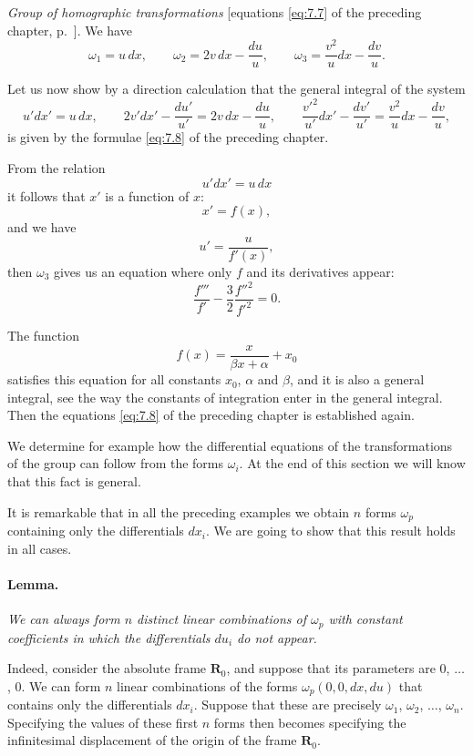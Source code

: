 \documentclass[leqno,11pt]{book}
\numberwithin{equation}{chapter}
\theoremstyle{shape1}
\theoremstyle{shapesmall}
\newcommand{\somespace}{\vspace{9pt}}
\begin{document}
{\somespace

\emph{Group of homographic transformations} [equations \eqref{eq:7.7} of the preceding chapter, p.~\pageref{eq:7.7}]. We have
\begin{equation}
  \label{eq:8.9}
  \omega_{1}=u\,dx,\qquad\omega_{2}=2v\,dx-\frac{du}{u},\qquad\omega_{3}=\frac{v^{2}}{u}dx-\frac{dv}{u}.
\end{equation}

Let us now show by a direction calculation that the general integral of the system
\[
u'dx'=u\,dx,\qquad 2v'dx'-\frac{du'}{u'}=2v\,dx-\frac{du}{u},\qquad\frac{v'^{2}}{u'}dx'-\frac{dv'}{u'}=\frac{v^{2}}{u}dx-\frac{dv}{u},
\]
is given by the formulae \eqref{eq:7.8} of the preceding chapter.

From the relation
\[
u'dx'=u\,dx
\]
it follows that $x'$ is a function of $x$:
\[
x'=f(x),
\]
and we have
\[
u'=\frac{u}{f'(x)},
\]
then $\omega_{3}$ gives us an equation where only $f$ and its derivatives appear:
\begin{equation}
  \label{eq:8.10}
  \frac{f'''}{f'}-\frac{3}{2}\frac{f''^{2}}{f'^{2}}=0.
\end{equation}

The function
\[
f(x)=\frac{x}{\beta x+\alpha}+x_{0}
\]
satisfies this equation for all constants $x_{0}$, $\alpha$ and $\beta$, and it is also a general integral, see the way the constants of integration enter in the general integral. Then the equations \eqref{eq:7.8} of the preceding chapter is established again.

We determine for example how the differential equations of the transformations of the group can follow from the forms $\omega_{i}$. At the end of this section we will know that this fact is general.

\somespace
}

It is remarkable that in all the preceding examples we obtain $n$ forms $\omega_{p}$ containing only the differentials $dx_{i}$. We are going to show that this result holds in all cases.


\paragraph{Lemma.}
\label{sec:109}
\emph{We can always form $n$ distinct linear combinations of $\omega_{p}$ with constant coefficients in which the differentials $du_{i}$ do not appear.}

\somespace

Indeed, consider the absolute frame $\mathbf{R}_{0}$, and suppose that its parameters are $0$, $\dots$, $0$. We can form $n$ linear combinations of the forms $\omega_{p}(0,0,dx,du)$ that contains only the differentials $dx_{i}$. Suppose that these are precisely $\omega_{1}$, $\omega_{2}$, $\dots$, $\omega_{n}$. Specifying the values of these first $n$ forms then becomes specifying the infinitesimal displacement of the origin of the frame $\mathbf{R}_{0}$.
\end{document}
